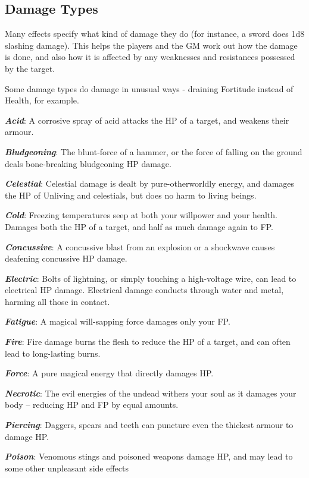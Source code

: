\subsection{Damage Types}



Many effects specify what kind of damage they do (for instance, a sword does 1d8 slashing damage). This helps the players and the GM work out how the damage is done, and also how it is affected by any weaknesses and resistances possessed by the target. 

Some damage types do damage in unusual ways - draining Fortitude instead of Health, for example. 

\newcommand\damage[2]
{
\textbf{ \textit{#1}}: #2
}

\damage{Acid}{A corrosive spray of acid attacks the HP of a target, and weakens their armour.}

\damage{Bludgeoning}{The blunt-force of a hammer, or the force of falling on the ground deals bone-breaking bludgeoning HP damage.}

\damage{Celestial}{Celestial damage is dealt by pure-otherworldly energy, and damages the HP of Unliving and celestials, but does no harm to living beings.}

\damage{Cold}{Freezing temperatures seep at both your willpower and your health. Damages both the HP of a target, and half as much damage again to FP. } 

\damage{Concussive}{A concussive blast from an explosion or a shockwave causes deafening concussive HP damage.}

\damage{Electric}{Bolts of lightning, or simply touching a high-voltage wire, can lead to electrical HP damage. Electrical damage conducts through water and metal, harming all those in contact.}

\damage{Fatigue}{A magical will-sapping force damages only your FP.}

\damage{Fire}{Fire damage burns the flesh to reduce the HP of a target, and can often lead to long-lasting burns.}

\damage{Force}{A pure magical energy that directly damages HP.}

\damage{Necrotic}{The evil energies of the undead withers your soul as it damages your body -- reducing HP and FP by equal amounts.}

\damage{Piercing}{Daggers, spears and teeth can puncture even the thickest armour to damage HP.}

\damage{Poison}{Venomous stings and poisoned weapons damage HP, and may lead to some other unpleasant side effects}

